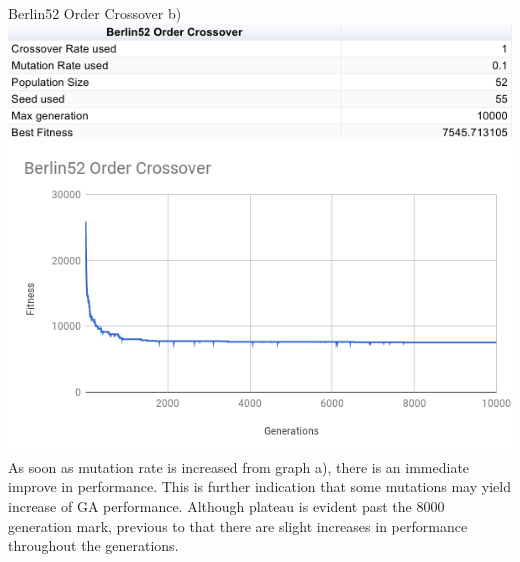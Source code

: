 \documentclass[conference]{IEEEtran}
\begin{document}
Berlin52 Order Crossover b)
\includegraphics[scale=0.42]{Berlin52/OC/Berlin52_OC_b)_table}
\includegraphics[scale=0.42]{Berlin52/OC/Berlin52_OC_b)}
As soon as mutation rate is increased from graph a), there is an immediate improve in performance. This is further indication that some mutations may yield increase of GA performance. Although plateau is evident past the 8000 generation mark, previous to that there are slight increases in performance throughout the generations.\\
\end{document}
